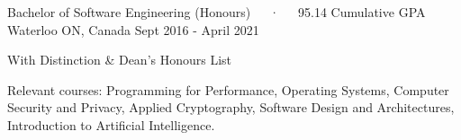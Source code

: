 
\begin{cventries}

  \vspace{0.5mm}

  	{Bachelor of Software Engineering (Honours)~~~·~~~95.14 Cumulative GPA}
  	 {Waterloo ON, Canada}
  	 {Sept 2016 - April 2021} {
    \begin{cvitems}
    \item With Distinction \& Dean's Honours List
    \item Relevant courses: Programming for Performance, Operating Systems, Computer Security and Privacy, 
    Applied Cryptography, Software Design and Architectures, Introduction to Artificial Intelligence.
    \end{cvitems}
  }
  

\end{cventries}
